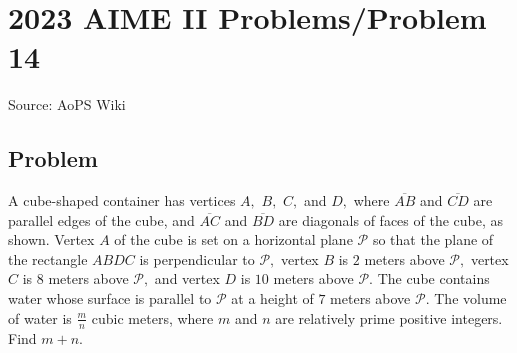 \documentclass[12pt]{article}
\begin{document}
\section*{{2023 AIME II Problems/Problem 14}}
Source: AoPS Wiki

\subsection*{Problem}
A cube-shaped container has vertices $A,$ $B,$ $C,$ and $D,$ where $\overline{AB}$ and $\overline{CD}$ are parallel edges of the cube, and $\overline{AC}$ and $\overline{BD}$ are diagonals of faces of the cube, as shown. Vertex $A$ of the cube is set on a horizontal plane $\mathcal{P}$ so that the plane of the rectangle $ABDC$ is perpendicular to $\mathcal{P},$ vertex $B$ is $2$ meters above $\mathcal{P},$ vertex $C$ is $8$ meters above $\mathcal{P},$ and vertex $D$ is $10$ meters above $\mathcal{P}.$ The cube contains water whose surface is parallel to $\mathcal{P}$ at a height of $7$ meters above $\mathcal{P}.$ The volume of water is $\frac{m}{n}$ cubic meters, where $m$ and $n$ are relatively prime positive integers. Find $m+n.$
\end{document}
